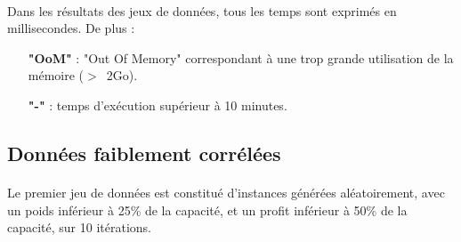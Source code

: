 \documentclass[12pt]{article}
\begin{document}
\paragraph{}Dans les résultats des jeux de données, tous les temps sont exprimés en millisecondes. De plus :
\begin{itemize}
 \item[\textbf{"OoM"}] : "Out Of Memory" correspondant à une trop grande utilisation de la mémoire ($>$~2Go).
 \item[\textbf{"-"}] : temps d'exécution supérieur à 10 minutes.
 \end{itemize}

\subsection{Données faiblement corrélées}

\paragraph{}Le premier jeu de données est constitué d'instances générées aléatoirement, avec un poids inférieur à 25\% de la capacité, et un profit inférieur à 50\% de la capacité, sur 10 itérations.
\end{document}

